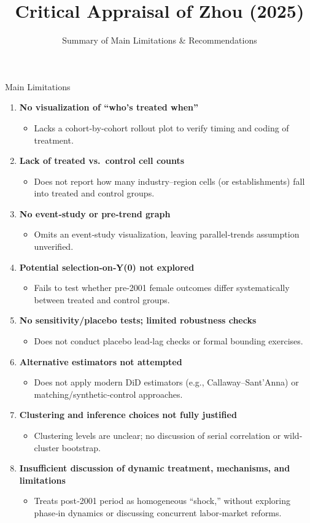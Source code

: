 \documentclass{beamer}
\title{Critical Appraisal of Zhou (2025)}
\subtitle{Summary of Main Limitations \& Recommendations}
\author{ }
\date{ }
\begin{document}
\frame{\titlepage}

\begin{frame}{Main Limitations}
  \begin{enumerate}
    \item \textbf{No visualization of ``who’s treated when''}
      \begin{itemize}
        \item Lacks a cohort‐by‐cohort rollout plot to verify timing and coding of treatment.
      \end{itemize}
    \item \textbf{Lack of treated vs.\ control cell counts}
      \begin{itemize}
        \item Does not report how many industry–region cells (or establishments) fall into treated and control groups.
      \end{itemize}
    \item \textbf{No event‐study or pre‐trend graph}
      \begin{itemize}
        \item Omits an event‐study visualization, leaving parallel‐trends assumption unverified.
      \end{itemize}
    \item \textbf{Potential selection‐on‐Y(0) not explored}
      \begin{itemize}
        \item Fails to test whether pre‐2001 female outcomes differ systematically between treated and control groups.
      \end{itemize}
    \item \textbf{No sensitivity/placebo tests; limited robustness checks}
      \begin{itemize}
        \item Does not conduct placebo lead‐lag checks or formal bounding exercises.
      \end{itemize}
    \item \textbf{Alternative estimators not attempted}
      \begin{itemize}
        \item Does not apply modern DiD estimators (e.g., Callaway–Sant’Anna) or matching/synthetic‐control approaches.
      \end{itemize}
    \item \textbf{Clustering and inference choices not fully justified}
      \begin{itemize}
        \item Clustering levels are unclear; no discussion of serial correlation or wild‐cluster bootstrap.
      \end{itemize}
    \item \textbf{Insufficient discussion of dynamic treatment, mechanisms, and limitations}
      \begin{itemize}
        \item Treats post‐2001 period as homogeneous “shock,” without exploring phase‐in dynamics or discussing concurrent labor‐market reforms.
      \end{itemize}
  \end{enumerate}
\end{frame}
\end{document}
